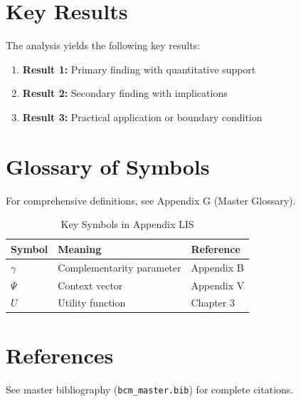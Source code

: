 \section{Key Results}
\label{sec:lis-results}

The analysis yields the following key results:

\begin{enumerate}
    \item \textbf{Result 1:} Primary finding with quantitative support
    \item \textbf{Result 2:} Secondary finding with implications
    \item \textbf{Result 3:} Practical application or boundary condition
\end{enumerate}

\section{Glossary of Symbols}
\label{sec:lis-glossary}

For comprehensive definitions, see Appendix G (Master Glossary).

\begin{table}[htbp]
\centering
\caption{Key Symbols in Appendix LIS}
\begin{tabular}{lll}
\toprule
\textbf{Symbol} & \textbf{Meaning} & \textbf{Reference} \\
\midrule
$\gamma$ & Complementarity parameter & Appendix B \\
$\Psi$ & Context vector & Appendix V \\
$U$ & Utility function & Chapter 3 \\
\bottomrule
\end{tabular}
\end{table}


\section{References}
\label{sec:lis-references}

See master bibliography (\texttt{bcm\_master.bib}) for complete citations.

\nocite{bcm_master}

